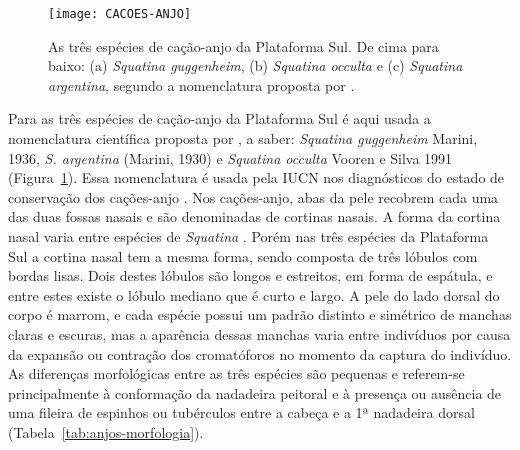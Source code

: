 \documentclass[a4paper,11pt,twoside,showtrims,onecolumn,openright,final]{memoir}
\begin{document}
%
%

\begin{figure}
\begin{center}
\texttt{[image: CACOES-ANJO]}
\end{center}
\caption[As três espécies de cação-anjo da Plataforma Sul: 
	 \emph{Squatina guggenheim}, \emph{Squatina occulta} e 
	 \emph{Squatina argentina}]
	{As três espécies de cação-anjo da Plataforma Sul. 
	 De cima para baixo: (a) \emph{Squatina guggenheim}, (b) \emph{Squatina occulta} e 
	 (c) \emph{Squatina argentina}, segundo a nomenclatura proposta por \citet{vooren1991}.}  %
\label{fig:anjos-3spp}
\end{figure}


Para as três espécies de cação-anjo da Plataforma Sul é aqui usada a nomenclatura 
científica proposta por \citet{vooren1991}, %
a saber:  \emph{Squatina guggenheim} Marini, 1936, \emph{S. argentina} (Marini, 1930) 
e  \emph{Squatina occulta} Vooren e Silva 1991 (Figura~\ref{fig:anjos-3spp}). %
Essa nomenclatura é usada pela IUCN nos diagnósticos do estado de 
conservação dos cações-anjo \citep{chiaramonte2004a,chiaramonte2004b}. %
Nos cações-anjo, abas da pele recobrem cada uma das duas fossas nasais e são denominadas 
de cortinas nasais.  A forma da cortina nasal varia entre espécies de \emph{Squatina} \citep{COMPAGNO1984A}. %
Porém nas três espécies da Plataforma Sul a cortina nasal tem a mesma forma, sendo composta de 
três lóbulos com bordas lisas. Dois destes lóbulos são longos e estreitos, em forma de espátula, 
e entre estes existe o lóbulo mediano que é curto e largo. A pele do lado dorsal do corpo é marrom, 
e cada espécie possui um padrão distinto e simétrico de manchas claras e escuras, mas a 
aparência dessas manchas varia entre indivíduos por causa da expansão ou contração dos 
cromatóforos no momento da captura do indivíduo. As diferenças morfológicas entre as três 
espécies são pequenas e referem-se principalmente à conformação da nadadeira peitoral e 
à presença ou ausência de uma fileira de espinhos ou tubérculos entre a cabeça 
e a 1ª nadadeira dorsal (Tabela~\ref{tab:anjos-morfologia}). %

%
%
\end{document}
